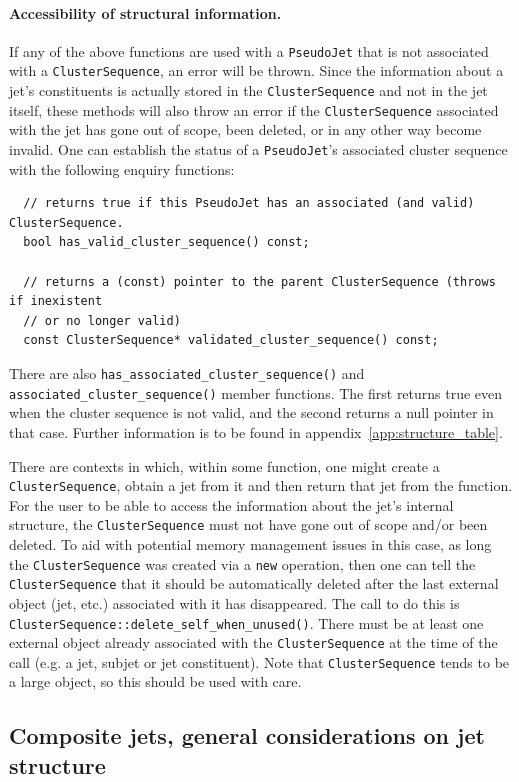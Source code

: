 \documentclass[12pt,a4]{article}
\newcommand{\ttt}[1]{{\small\texttt{#1}}}
\newcommand{\PseudoJet}{\ttt{PseudoJet}\xspace}
\newcommand{\ClusterSequence}{\ttt{ClusterSequence}\xspace}
\newcommand{\CS}{\ttt{ClusterSequence}\xspace}
\begin{document}
\paragraph{Accessibility of structural information.}
If any of the above functions are used with a \PseudoJet that is not
associated with a \ClusterSequence, an error will be thrown. 
%
Since the information about a jet's constituents is actually stored in
the \CS and not in the jet itself, these methods will also throw an
error if the \CS associated with the jet has gone out of scope, been
deleted, or in any other way become invalid.
%
One can establish the status of a \PseudoJet's associated cluster
sequence with the following enquiry functions:
\begin{lstlisting}
  // returns true if this PseudoJet has an associated (and valid) ClusterSequence.
  bool has_valid_cluster_sequence() const;

  // returns a (const) pointer to the parent ClusterSequence (throws if inexistent 
  // or no longer valid) 
  const ClusterSequence* validated_cluster_sequence() const; 
\end{lstlisting}
There are also \ttt{has\_associated\_cluster\_sequence()} and
\ttt{associated\_cluster\_sequence()} member functions. The first
returns true even when the cluster sequence is not valid, and the
second returns a null pointer in that case.
%
Further information is to be found in
appendix~\ref{app:structure_table}.

There are contexts in which, within some function, one might create a
\ClusterSequence, obtain a jet from it and then return that jet from
the function. For the user to be able to access the information about
the jet's internal structure, the \ClusterSequence must not have gone
out of scope and/or been deleted.
%
To aid with potential memory management issues in this case, as long
the \ClusterSequence was created via a \ttt{new} operation,
then one can tell the \ClusterSequence that it should be automatically
deleted after the last external object (jet, etc.)  associated with it
has disappeared. 
%
The call to do this is
\ttt{ClusterSequence::delete\_self\_when\_unused()}. There must be at
least one external object already associated with the \ClusterSequence
at the time of the call (e.g. a jet, subjet or jet constituent).
%
Note that \ClusterSequence tends to be a large object, so this should be
used with care.

\subsection{Composite jets, general considerations on jet structure}
\label{sec:composite-jet}
\end{document}
